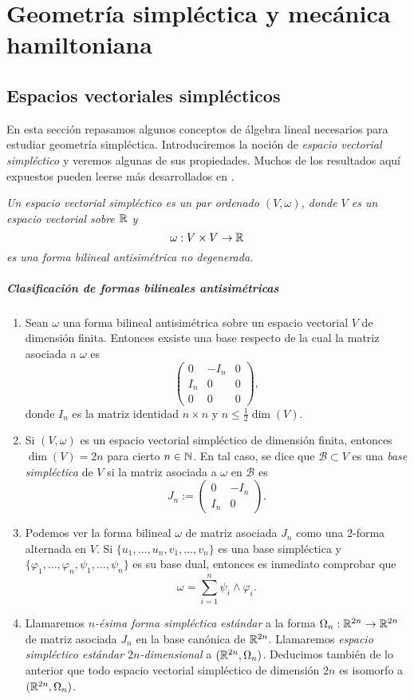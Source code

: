 \chapter{Geometría simpléctica y mecánica hamiltoniana}\label{cap:simplectica}
\section{Espacios vectoriales simplécticos}
En esta sección repasamos algunos conceptos de álgebra lineal necesarios para estudiar geometría simpléctica. Introduciremos la noción de \emph{espacio vectorial simpléctico} y veremos algunas de sus propiedades. Muchos de los resultados aquí expuestos pueden leerse más desarrollados en \cite{algebra}.
\begin{defn}
  \em
Un \emph{espacio vectorial simpléctico} es un par ordenado $(V,\omega)$, donde $V$ es un espacio vectorial sobre $\mathbb{R}$ y 
	\[
	  \omega: V \times V \rightarrow \mathbb{R}
	\]
	es una forma bilineal antisimétrica no degenerada.
\end{defn}

\paragraph{\bf Clasificación de formas bilineales antisimétricas}
  \begin{enumerate}
    \item Sean $\omega$ una forma bilineal antisimétrica sobre un espacio vectorial $V$ de dimensión finita. Entonces exsiste una base respecto de la cual la matriz asociada a $\omega$ es
      \[
	\left(
	\begin{array}{ccc}
	  0 & -I_n & 0 \\
	  I_n & 0 & 0 \\
	  0 & 0 & 0
	\end{array}\right),
      \]
      donde $I_n$ es la matriz identidad $n \times n$ y $n\leq \tfrac{1}{2}\dim (V)$.
    \item Si $(V,\omega)$ es un espacio vectorial simpléctico de dimensión finita, entonces $\dim(V)=2n$ para cierto $n \in \mathbb{N}$. En tal caso, se dice que $\mathscr{B}\subset V$ es una \emph{base simpléctica} de $V$ si la matriz asociada a $\omega$ en $\mathscr{B}$ es
\[
  J_n :=
\left(
	\begin{array}{cc}
	  0 & -I_n  \\
	  I_n & 0 
	\end{array}\right).
      \]
    \item Podemos ver la forma bilineal $\omega$ de matriz asociada $J_n$ como una $2$-forma alternada en $V$. Si $\{u_1,\dots,u_n,v_1,\dots,v_n\}$ es una base simpléctica y $\{\varphi_1,\dots, \varphi_n, \psi_1,\dots, \psi_n \}$ es su base dual, entonces es inmediato comprobar que
  \[
    \omega =  \sum_{i=1}^n \psi_i \wedge \varphi_i.
  \]
  \item Llamaremos \emph{$n$-ésima forma simpléctica estándar} a la forma $\Omega_n:\mathbb{R}^{2n} \rightarrow \mathbb{R}^{2n}$ de matriz asociada $J_n$ en la base canónica de $\mathbb{R}^{2n}$. Llamaremos \emph{espacio simpléctico estándar $2n$-dimensional} a $(\mathbb{R}^{2n},\Omega_n)$. Deducimos también de lo anterior que todo espacio vectorial simpléctico de dimensión $2n$ es isomorfo a $(\mathbb{R}^{2n},\Omega_n)$.
\end{enumerate}
